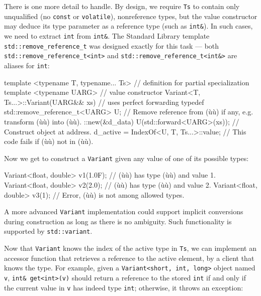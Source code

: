 There is one more detail to handle. By design, we require \lstinline!Ts! to
contain only unqualified (no \lstinline!const! or \lstinline!volatile!),
nonreference types, but the value constructor may deduce its type
parameter as a reference type (such as \lstinline!int&!). In such cases,
we need to extract \lstinline!int! from \lstinline!int&!. The Standard
Library template \lstinline!std::remove_reference_t! was designed exactly
for this task --- both \lstinline!std::remove_reference_t<int>! and
\lstinline!std::remove_reference_t<int&>! are aliases for \lstinline!int!:

\begin{emcppslisting}[emcppsbatch={e38,e39}]
template <typename T, typename... Ts>  // definition for partial specialization
template <typename UARG>               // value constructor
Variant<T, Ts...>::Variant(UARG&& xs)  // uses perfect forwarding
{
    typedef std::remove_reference_t<UARG> U;
        // Remove reference from (ù{}ù) if any, e.g. transform (ù{}ù) into (ù{}ù).
    ::new(&d_data) U(std::forward<UARG>(xs));  // Construct object at address.
    d_active = IndexOf<U, T, Ts...>::value;    // This code fails if (ù{}ù) not in (ù{}ù).
}
\end{emcppslisting}
    

\noindent Now we get to construct a \lstinline!Variant! given any value of one of its
possible types:

\begin{emcppslisting}[emcppsbatch={e38,e39}]
Variant<float, double> v1(1.0F);  // (ù{}ù) has type (ù{}ù) and value 1.
Variant<float, double> v2(2.0);   // (ù{}ù) has type (ù{}ù) and value 2.
Variant<float, double> v3(1);     // Error, (ù{}ù) is not among allowed types.
\end{emcppslisting}
    

\noindent A more advanced \lstinline!Variant! implementation could support implicit
conversions during construction as long as there is no ambiguity. Such
functionality is supported by \lstinline!std::variant!.

Now that \lstinline!Variant! knows the index of the active type in
\lstinline!Ts!, we can implement an accessor function that retrieves a
reference to the active element, by a client that knows the type. For
example, given a \lstinline!Variant<short,!~\lstinline!int,!~\lstinline!long>!
object named \lstinline!v!, \lstinline!int&!~\lstinline!get<int>(v)! should
return a reference to the stored \lstinline!int! if and only if the current
value in \lstinline!v! has indeed type \lstinline!int!; otherwise, it throws
an exception:

